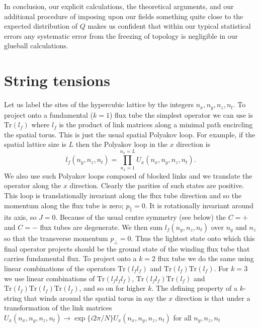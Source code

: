 \documentclass[12pt]{article}
\begin{document}
In conclusion, our explicit calculations, the theoretical arguments, and our
additional procedure of imposing upon our fields something quite close to the 
expected distribution of $Q$ makes us confident that within our typical statistical 
errors any systematic error from the freezing of topology is negligible in our 
glueball calculations. 





%
%
%
%
\section{String tensions}
\label{section_strings} 


Let us label the sites of the hypercubic lattice by the integers $n_x,n_y,n_z,n_t$.
To project onto a fundamental ($k=1$) flux tube the simplest operator we can use is
$\mathrm{Tr}(l_f)$ where $l_f$ is the product of link matrices along a minimal path
encircling  the spatial torus. This is just the usual spatial Polyakov loop. For example,
if the spatial lattice size is $L$ then the Polyakov loop in the $x$ direction is
%
\begin{equation}
 l_f(n_y,n_z,n_t) = \prod_{n_x=1}^{n_x=L} U_x(n_x,n_y,n_z,n_t).
  \label{eqn_Poly}
\end{equation}
%
We also use such Polyakov loops composed of blocked links and we translate the operator
along the $x$ direction.
Clearly the parities of such states are positive. This loop is translationally
invariant along the flux tube direction and so the momentum along the flux tube is
zero; $p_{\parallel}=0$. It is rotationally invariant around its axis, so $J=0$.
Because of the usual centre symmetry (see below) the $C=+$ and $C=-$ flux tubes are
degenerate. We then sum $l_f(n_y,n_z,n_t)$ over $n_y$ and $n_z$ so that the transverse
momentum $p_{\perp}=0$. Thus the lightest state onto which this final operator projects
should be the ground state of the winding flux tube that carries fundamental flux.
To project onto a $k=2$ flux tube we do the same using linear combinations of the
operators $\mathrm{Tr}(l_fl_f)$ and $\mathrm{Tr}(l_f)\mathrm{Tr}(l_f)$. For $k=3$ we use linear
combinations of $\mathrm{Tr}(l_fl_fl_f)$, $\mathrm{Tr}(l_fl_f)\mathrm{Tr}(l_f)$ and
$\mathrm{Tr}(l_f)\mathrm{Tr}(l_f)\mathrm{Tr}(l_f)$, and so on for higher $k$.
The defining property of a $k$-string that winds around the spatial torus in say the
$x$ direction is that under a transformation of the link matrices
$U_x(n_x,n_y,n_z,n_t) \to \exp\{i2\pi /N\} U_x(n_x,n_y,n_z,n_t)$ for all $n_y,n_z,n_t$
\end{document}
